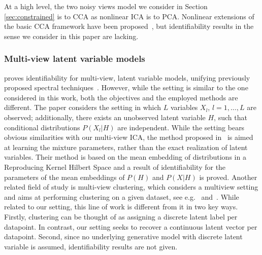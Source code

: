 At a high level, the two noisy views model we consider in Section \ref{sec:constrained} is to CCA as nonlinear ICA is to PCA.
Nonlinear extensions of the basic CCA framework have been proposed~\citep{lai2000kernel, fukumizu2007statistical, andrew2013deep, michaeli2016nonparametric}, but identifiability results in the sense we consider in this paper are lacking.



\subsubsection{Multi-view latent variable models}



\cite{song2014nonparametric} proves identifiability for multi-view, latent variable models, unifying previously proposed spectral techniques~\cite{anandkumar2014tensor}. However, while the setting is similar to the one considered in this work, both the objectives and the employed methods are different.
The paper considers the setting in which $L$ variables $X_l$, $l=1, \ldots, L$ are observed; additionally, there exists an unobserved latent variable $H$, such that conditional distributions $P(X_l|H)$ are independent. While the setting bears obvious similarities with our multi-view ICA, the method proposed in~\cite{song2014nonparametric} is aimed at learning the mixture parameters, rather than the exact realization of latent variables.
Their method is based on the mean embedding of distributions in a Reproducing Kernel Hilbert Space and a result of identifiability for the parameters of the mean embeddings of $P(H)$ and $P(X|H)$ is proved.
Another related field of study is multi-view clustering, which considers a multiview setting and aims at performing clustering on a given dataset, see e.g.~\cite{de2005spectral} and~\cite{kumar2011co}. While related to our setting, this line of work is different from it in two key ways.
Firstly, clustering can be thought of as assigning a discrete latent label per datapoint. In contrast, our setting seeks to recover a continuous latent vector per datapoint.
Second, since no underlying generative model with discrete latent variable is assumed, identifiability results are not given.



